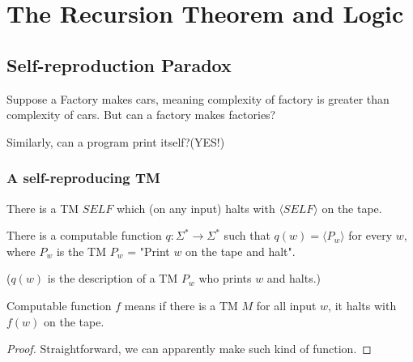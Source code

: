 \chapter{The Recursion Theorem and Logic}

\section{Self-reproduction Paradox}

Suppose a Factory makes cars, meaning complexity of factory is greater than complexity of cars. But can a factory makes factories? 

Similarly, can a program print itself?(YES!)

\subsection{A self-reproducing TM}
\begin{theorem}
    There is a TM \(SELF\) which (on any input) halts with \(\langle SELF \rangle\) on the tape. 

    \begin{lemma}
        There is a computable function \(q: \Sigma^* \rightarrow \Sigma^*\) such that \(q(w) = \langle P_w \rangle \)  for every \(w\), where \(P_w\) is the TM \(P_w\) = "Print \(w\) on the tape and halt".

        (\(q(w)\) is the description of a TM \(P_w\) who prints \(w\) and halts.)
        \begin{note}
            Computable function \(f\) means if there is a TM \(M\) for all input \(w\), it halts with \(f(w)\) on the tape. 
        \end{note}      
    \end{lemma}
    \begin{proof}
        Straightforward, we can apparently make such kind of function.
    \end{proof}
\end{theorem}

